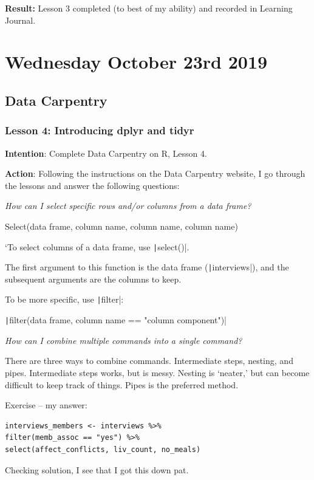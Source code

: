 \documentclass{article}
\begin{document}
\textbf{Result:} Lesson 3 completed (to best of my ability) and recorded in Learning Journal.

\section{Wednesday October 23rd 2019}

\subsection{Data Carpentry}

\subsubsection{Lesson 4: Introducing dplyr and tidyr}

\textbf{Intention}: Complete Data Carpentry on R, Lesson 4.

\textbf{Action}: Following the instructions on the Data Carpentry website, I go through the lessons and answer the following questions:

\textit{How can I select specific rows and/or columns from a data frame?}

Select(data frame, column name, column name, column name)

`To select columns of a data frame, use \texttt|select()|.

The first argument to this function is the data frame (\texttt|interviews|), and the subsequent arguments are the columns to keep.

To be more specific, use \texttt|filter|:

\texttt|filter(data frame, column name == "column component")|

\textit{How can I combine multiple commands into a single command?}

There are three ways to combine commands.
Intermediate steps, nesting, and pipes.
Intermediate steps works, but is messy.
Nesting is ‘neater,’ but can become difficult to keep track of things.
Pipes is the preferred method.

Exercise – my answer: 

\begin{verbatim}
interviews_members <- interviews %>%
filter(memb_assoc == "yes") %>%
select(affect_conflicts, liv_count, no_meals)
\end{verbatim}

{\item Checking solution, I see that I got this down pat.}
\end{document}
